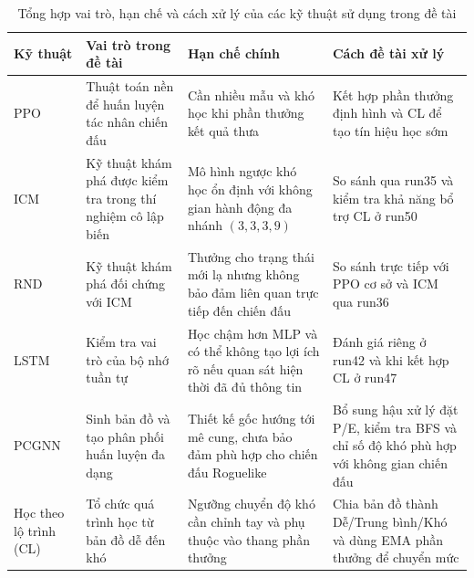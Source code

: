 \begin{table}[H]
    \centering
    \small
    \caption{Tổng hợp vai trò, hạn chế và cách xử lý của các kỹ thuật sử dụng trong đề tài}
    \label{tab:technique_summary}
    \begin{tabular}{|p{2.0cm}|p{3.0cm}|p{4.4cm}|p{4.1cm}|}
        \hline
        \textbf{Kỹ thuật} & \textbf{Vai trò trong đề tài} & \textbf{Hạn chế chính} & \textbf{Cách đề tài xử lý} \\
        \hline
        PPO & Thuật toán nền để huấn luyện tác nhân chiến đấu & Cần nhiều mẫu và khó học khi phần thưởng kết quả thưa & Kết hợp phần thưởng định hình và CL để tạo tín hiệu học sớm \\
        \hline
        ICM & Kỹ thuật khám phá được kiểm tra trong thí nghiệm cô lập biến & Mô hình ngược khó học ổn định với không gian hành động đa nhánh $(3,3,3,9)$ & So sánh qua run35 và kiểm tra khả năng bổ trợ CL ở run50 \\
        \hline
        RND & Kỹ thuật khám phá đối chứng với ICM & Thưởng cho trạng thái mới lạ nhưng không bảo đảm liên quan trực tiếp đến chiến đấu & So sánh trực tiếp với PPO cơ sở và ICM qua run36 \\
        \hline
        LSTM & Kiểm tra vai trò của bộ nhớ tuần tự & Học chậm hơn MLP và có thể không tạo lợi ích rõ nếu quan sát hiện thời đã đủ thông tin & Đánh giá riêng ở run42 và khi kết hợp CL ở run47 \\
        \hline
        PCGNN & Sinh bản đồ và tạo phân phối huấn luyện đa dạng & Thiết kế gốc hướng tới mê cung, chưa bảo đảm phù hợp cho chiến đấu Roguelike & Bổ sung hậu xử lý đặt P/E, kiểm tra BFS và chỉ số độ khó phù hợp với không gian chiến đấu \\
        \hline
        Học theo lộ trình (CL) & Tổ chức quá trình học từ bản đồ dễ đến khó & Ngưỡng chuyển độ khó cần chỉnh tay và phụ thuộc vào thang phần thưởng & Chia bản đồ thành Dễ/Trung bình/Khó và dùng EMA phần thưởng để chuyển mức \\
        \hline
    \end{tabular}
\end{table}
